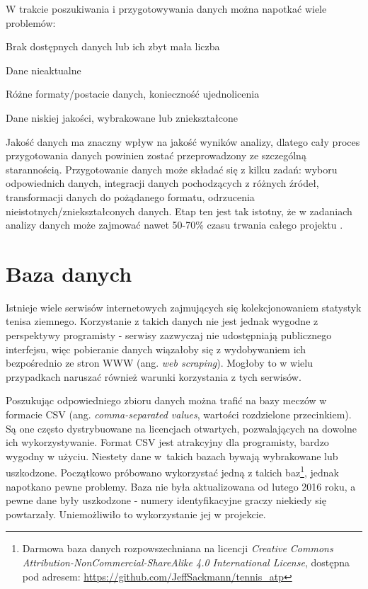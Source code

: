 W trakcie poszukiwania i przygotowywania danych można napotkać wiele problemów:
\begin{tightitemize}
\item Brak dostępnych danych lub ich zbyt mała liczba
\item Dane nieaktualne
\item Różne formaty/postacie danych, konieczność ujednolicenia
\item Dane niskiej jakości, wybrakowane lub zniekształcone
\end{tightitemize}

Jakość danych ma znaczny wpływ na jakość wyników analizy, dlatego cały proces przygotowania danych powinien zostać przeprowadzony ze szczególną starannością. Przygotowanie danych może składać się z kilku zadań: wyboru odpowiednich danych, integracji danych pochodzących z różnych źródeł, transformacji danych do pożądanego formatu, odrzucenia nieistotnych/zniekształconych danych. Etap ten jest tak istotny, że w zadaniach analizy danych może zajmować nawet 50-70\% czasu trwania całego projektu \cite{satt01}.

\section{Baza danych}
\label{Sec:DataBase}
Istnieje wiele serwisów internetowych zajmujących się kolekcjonowaniem statystyk tenisa ziemnego. Korzystanie z takich danych nie jest jednak wygodne z perspektywy programisty - serwisy zazwyczaj nie udostępniają publicznego interfejsu, więc pobieranie danych wiązałoby się z wydobywaniem ich bezpośrednio ze stron WWW (ang. \textit{web scraping}). Mogłoby to w wielu przypadkach naruszać również warunki korzystania z tych serwisów.

Poszukując odpowiedniego zbioru danych można trafić na bazy meczów w formacie CSV (ang. \textit{comma-separated values}, wartości rozdzielone przecinkiem). Są one często dystrybuowane na licencjach otwartych, pozwalających na dowolne ich wykorzystywanie. Format CSV jest atrakcyjny dla programisty, bardzo wygodny w użyciu. Niestety dane w~takich bazach bywają wybrakowane lub uszkodzone. Początkowo próbowano wykorzystać jedną z takich baz\footnote{Darmowa baza danych rozpowszechniana na licencji \textit{Creative Commons Attribution-NonCommercial-ShareAlike 4.0 International License}, dostępna pod adresem: \url{https://github.com/JeffSackmann/tennis_atp}}, jednak napotkano pewne problemy. Baza nie była aktualizowana od lutego 2016 roku, a pewne dane były uszkodzone - numery identyfikacyjne graczy niekiedy się powtarzały. Uniemożliwiło to wykorzystanie jej w projekcie.

